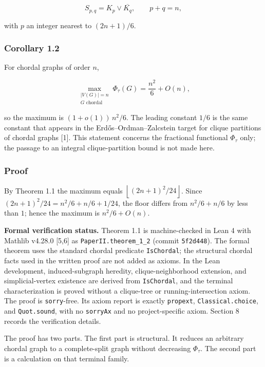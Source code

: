 \documentclass[
  11pt,
]{article}
\begin{document}
\[
S_{p,q}=K_p\vee\overline{K_q},
\qquad
p+q=n,
\]

with \(p\) an integer nearest to \((2n+1)/6\).

\subsubsection{Corollary 1.2}\label{corollary-1.2}

For chordal graphs of order \(n\),

\[
\max_{\substack{|V(G)|=n\\G\text{ chordal}}}\Phi_\tau(G)=\frac{n^2}{6}+O(n),
\]

so the maximum is \((1+o(1))\,n^2/6\). The leading constant \(1/6\) is
the same constant that appears in the Erdős--Ordman--Zalcstein target
for clique partitions of chordal graphs {[}1{]}. This statement concerns
the fractional functional \(\Phi_\tau\) only; the passage to an integral
clique-partition bound is not made here.

\subsubsection{Proof}\label{proof}

By Theorem 1.1 the maximum equals
\(\left\lfloor(2n+1)^2/24\right\rfloor\). Since
\((2n+1)^2/24=n^2/6+n/6+1/24\), the floor differs from \(n^2/6+n/6\) by
less than \(1\); hence the maximum is \(n^2/6+O(n)\).

\textbf{Formal verification status.} Theorem 1.1 is machine-checked in
Lean 4 with Mathlib v4.28.0 {[}5,6{]} as \texttt{PaperII.theorem\_1\_2}
(commit \texttt{5f2d448}). The formal theorem uses the standard chordal
predicate \texttt{IsChordal}; the structural chordal facts used in the
written proof are not added as axioms. In the Lean development,
induced-subgraph heredity, clique-neighborhood extension, and
simplicial-vertex existence are derived from \texttt{IsChordal}, and the
terminal characterization is proved without a clique-tree or
running-intersection axiom. The proof is \texttt{sorry}-free. Its axiom
report is exactly \texttt{propext}, \texttt{Classical.choice}, and
\texttt{Quot.sound}, with no \texttt{sorryAx} and no project-specific
axiom. Section 8 records the verification details.

The proof has two parts. The first part is structural. It reduces an
arbitrary chordal graph to a complete-split graph without decreasing
\(\Phi_\tau\). The second part is a calculation on that terminal family.
\end{document}
